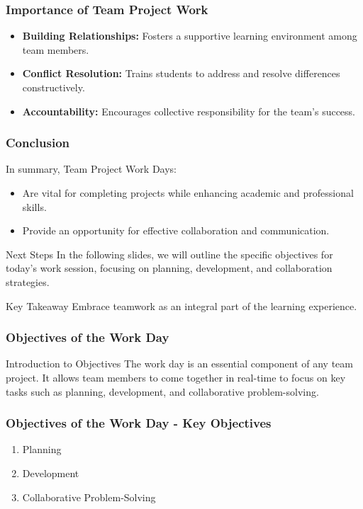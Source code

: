 \documentclass{beamer}
\begin{document}
\begin{frame}[fragile]
    \frametitle{Importance of Team Project Work}
    \begin{itemize}
        \item \textbf{Building Relationships:} Fosters a supportive learning environment among team members.
        \item \textbf{Conflict Resolution:} Trains students to address and resolve differences constructively.
        \item \textbf{Accountability:} Encourages collective responsibility for the team's success.
    \end{itemize}
\end{frame}

\begin{frame}[fragile]
    \frametitle{Conclusion}
    In summary, Team Project Work Days:
    \begin{itemize}
        \item Are vital for completing projects while enhancing academic and professional skills.
        \item Provide an opportunity for effective collaboration and communication.
    \end{itemize}
    \begin{block}{Next Steps}
        In the following slides, we will outline the specific objectives for today's work session, focusing on planning, development, and collaboration strategies.
    \end{block}
    \begin{block}{Key Takeaway}
        Embrace teamwork as an integral part of the learning experience.
    \end{block}
\end{frame}

\begin{frame}[fragile]
    \frametitle{Objectives of the Work Day}
    \begin{block}{Introduction to Objectives}
        The work day is an essential component of any team project. It allows team members to come together in real-time to focus on key tasks such as planning, development, and collaborative problem-solving.
    \end{block}
\end{frame}

\begin{frame}[fragile]
    \frametitle{Objectives of the Work Day - Key Objectives}
    \begin{enumerate}
        \item Planning
        \item Development
        \item Collaborative Problem-Solving
    \end{enumerate}
\end{frame}
\end{document}

